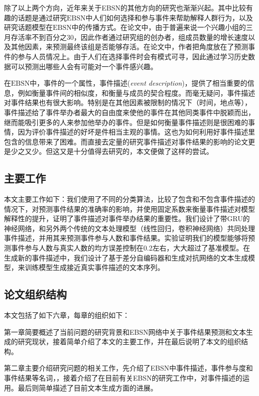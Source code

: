除了以上两个方向，近年来关于EBSN的其他方向的研究也渐渐兴起。其中比较有趣的话题是通过研究$\mathrm{EBSN}$中人们如何选择和参与事件来帮助解释人群行为\cite{EBSN_understanding}，以及研究话题模型在$\mathrm{EBSN}$中的传播方式。在论文\cite{EBSN_can_i}中，由于普遍来说一个兴趣小组的三月存活率不到百分之30，因此作者通过研究组的创办者，组成员数量的增长速度以及其他因素，来预测最终该组是否能够存活。在论文\cite{EBSN_who_will}中，作者把角度放在了预测事件的参与人员情况上。由于人们在选择事件时会有模式可寻，因此通过学习历史数据可以预测出哪些人会有可能对一个事件感兴趣。

在$\mathrm{EBSN}$中，事件的一个属性，事件描述(\textit{event description})，提供了相当重要的信息，例如衡量事件间的相似度，和衡量与成员的契合程度。而毫无疑问，事件描述对事件结果也有很大影响。特别是在其他因素被限制的情况下（时间，地点等），事件描述给了事件举办者最大的自由度来使他的事件在其他同类事件中脱颖而出，继而能吸引更多的人来参加他举办的事件。但是如何衡量事件描述则是很困难的事情，因为评价事件描述的好坏是件相当主观的事情。这也为如何利用好事件描述里包含的信息带来了困难。而直接去定量的研究事件描述对事件结果的影响的论文更是少之又少。但这又是十分值得去研究的，本文便做了这样的尝试。

\subsection{主要工作}
本文主要工作如下：我们使用了不同的分类算法，比较了包含和不包含事件描述的情况下，对预测事件结果的准确率的影响，并使用固定系数来衡量事件描述对模型解释性的提升，证明了事件描述对事件举办结果的重要性。我们设计了带GRU的神经网络，和另外两个传统的文本处理模型（线性回归，卷积神经网络）共同处理事件描述，并用其来预测事件参与人数和事件结果。实验证明我们的模型能够将预测事件参与人数与真实人数的均方误差控制在0.2左右，大大超过了基准模型。在生成新的事件描述中，我们设计了基于差分自编码器和生成对抗网络的文本生成模型，来训练模型生成接近真实事件描述的文本序列。
\subsection{论文组织结构}
本文包括了如下六章，每章的组织如下：

第一章简要概述了当前问题的研究背景和EBSN网络中关于事件结果预测和文本生成的研究现状，接着简单介绍了本文的主要工作，并在最后说明了本文的组织结构。

第二章主要介绍研究问题的相关工作，先介绍了EBSN中事件描述，事件参与度和事件结果等名词，，接着介绍了在目前有关EBSN的研究工作中，对事件描述的运用。最后则简单描述了目前文本生成方面的进展。 

